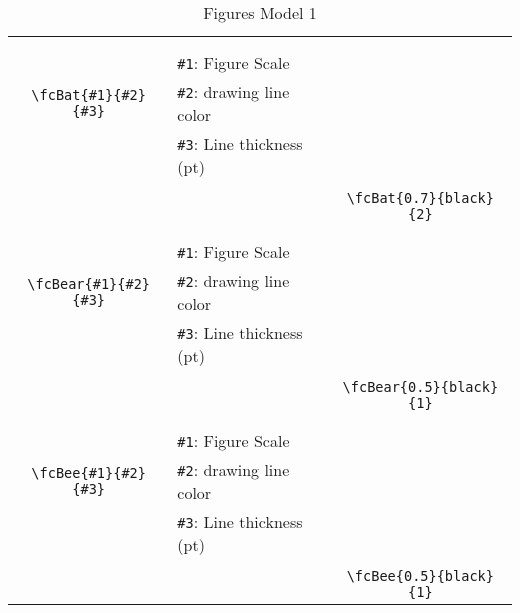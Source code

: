 \documentclass{article}
\begin{document}
\begin{table}[H]
\begin{tabular}{|c|l|c|}
	&&\multirow{5}{*}{\fcBat{0.7}{black}{2}}\\	&&\\	&\verb|#1|: Figure Scale &\\	\verb|\fcBat{#1}{#2}{#3}|&	\verb|#2|: drawing line color &\\	&\verb|#3|: Line thickness (pt) &\\ &&\\&&	\verb|\fcBat{0.7}{black}{2}|\\\hline 	
	&&\multirow{5}{*}{\fcBear{0.5}{black}{1}}\\	&&\\	&\verb|#1|: Figure Scale &\\	\verb|\fcBear{#1}{#2}{#3}|&	\verb|#2|: drawing line color &\\	&\verb|#3|: Line thickness (pt) &\\ &&\\&&	\verb|\fcBear{0.5}{black}{1}|\\\hline 	
	&&\multirow{5}{*}{\fcBee{0.5}{black}{1}}\\	&&\\	&\verb|#1|: Figure Scale &\\	\verb|\fcBee{#1}{#2}{#3}|&	\verb|#2|: drawing line color &\\	&\verb|#3|: Line thickness (pt) &\\ &&\\&&	\verb|\fcBee{0.5}{black}{1}|\\\hline 	\hline\end{tabular}\caption{Figures Model 1}\label{tab1}\end{table}
\end{document}
